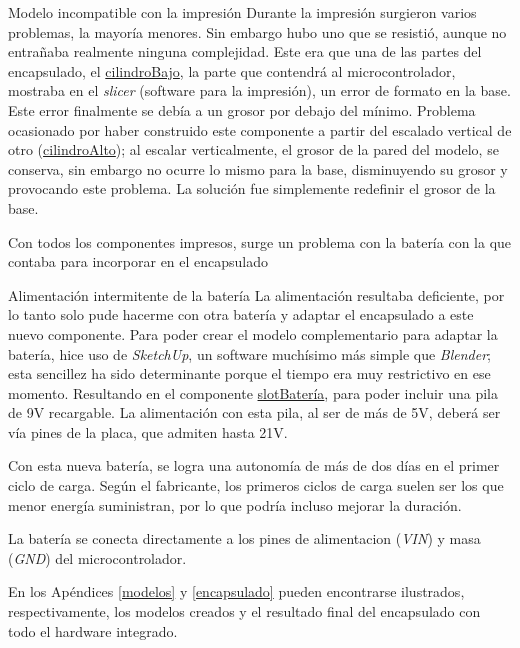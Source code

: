 \begin{problemas}{Modelo incompatible con la impresión}
    \color{mitexto}
    Durante la impresión surgieron varios problemas, la mayoría menores.
    Sin embargo hubo uno que se resistió, aunque no entrañaba realmente ninguna complejidad.
    Este era que una de las partes del encapsulado, el
    \href{https://github.com/AntonioPriego/SmartPen/tree/main/SmartPenModel/Components/cilindroBajo}{cilindroBajo},
    la parte que contendrá al microcontrolador, mostraba en el \textit{slicer} (software
    para la impresión), un error de formato en la base. Este error finalmente se debía
    a un grosor por debajo del mínimo. Problema ocasionado por haber construido
    este componente a partir del escalado vertical de otro
    (\href{https://github.com/AntonioPriego/SmartPen/tree/main/SmartPenModel/Components/cilindroAlto}{cilindroAlto});
    al escalar verticalmente, el grosor de la pared del modelo, se conserva, sin embargo
    no ocurre lo mismo para la base, disminuyendo su grosor y provocando este problema.
    La solución fue simplemente redefinir el grosor de la base.
\end{problemas}

Con todos los componentes impresos, surge un problema con la batería con la que contaba
para incorporar en el encapsulado

\begin{problemas}{Alimentación intermitente de la batería\label{problemaBateria}}
    \color{mitexto}
    La alimentación resultaba deficiente, por lo tanto solo pude hacerme con
    otra batería y adaptar el encapsulado a este nuevo componente.
    Para poder crear el modelo complementario para adaptar la batería, hice uso
    de \textit{SketchUp}, un software muchísimo más simple que \textit{Blender};
    esta sencillez ha sido determinante porque el tiempo era muy restrictivo en ese momento.
    Resultando en el componente
    \href{https://github.com/AntonioPriego/SmartPen/tree/main/SmartPenModel/Components/slotBateria}{slotBatería},
    para poder incluir una pila de 9V recargable. La alimentación con esta pila, al ser de más
    de 5V, deberá ser vía pines de la placa, que admiten hasta 21V.
\end{problemas}

Con esta nueva batería, se logra una autonomía de más de dos días en el primer ciclo
de carga. Según el fabricante, los primeros ciclos de carga suelen ser los que menor
energía suministran, por lo que podría incluso mejorar la duración.

La batería se conecta directamente a los pines de alimentacion (\textit{VIN})
y masa (\textit{GND}) del microcontrolador.

En los Apéndices \ref{modelos} y \ref{encapsulado} pueden encontrarse ilustrados,
respectivamente, los modelos creados y el resultado final del encapsulado con
todo el hardware integrado.